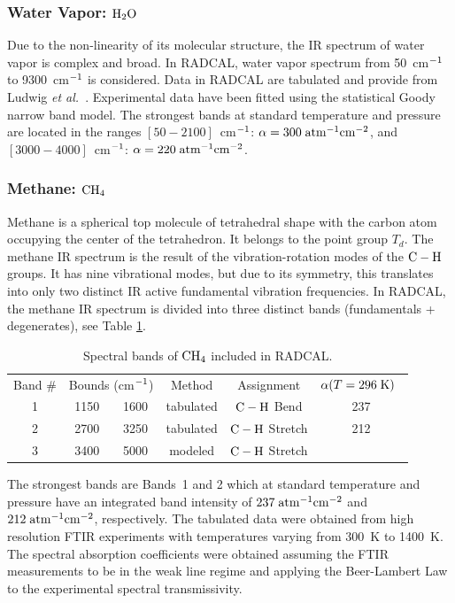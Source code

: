 \subsubsection{Water Vapor: $\rm H_2O$}

Due to the non-linearity of its molecular structure, the IR spectrum of water vapor is complex and broad. In RADCAL, water vapor spectrum from 50~cm$\rm ^{-1}$ to 9300~cm$\rm ^{-1}$ is considered. Data in RADCAL are tabulated and provide from Ludwig \textit{et al.}~\cite{Ludwig:NASA}. Experimental data have been fitted using the statistical Goody narrow band model. The strongest bands at standard temperature and pressure are located in the ranges $\left[50-2100\right]$~cm$\rm ^{-1}$: $\alpha = 300\;\rm {atm^{-1}cm^{-2}}$, and $\left[3000-4000\right]$~cm$\rm ^{-1}$: $\alpha = 220\;\rm {atm^{-1}cm^{-2}}$.

\subsubsection{Methane: $\rm CH_4$}

Methane is a spherical top molecule of tetrahedral shape with the carbon atom occupying the center of the tetrahedron. It belongs to the point group $T_d$. The methane IR spectrum is the result of the vibration-rotation modes of the $\rm C-H$ groups. It has nine vibrational modes, but due to its symmetry, this translates into only two distinct IR active fundamental vibration frequencies. In RADCAL, the methane IR spectrum is divided into three distinct bands (fundamentals + degenerates), see Table \ref{Table::CH4}.
\begin{table}[ht]
      \centering
      \caption{Spectral bands of $\rm CH_4$ included in RADCAL.}
      \vspace{0.1in}
      \label{Table::CH4}
    \begin{tabular}{|c|c|c|c|c|c|}
    \hline
    Band \# & \multicolumn{2}{|l|}{Bounds (cm$\rm ^{-1}$) } & Method & Assignment & $\alpha(T=296 \; {\rm K})$\ \\
    \cline{1-6}
    1 & 1150 & 1600 & tabulated &  $\rm C-H$ Bend    & 237  \\
    2 & 2700 & 3250 & tabulated &  $\rm C-H$ Stretch & 212  \\
    3 & 3400 & 5000 & modeled   &  $\rm C-H$ Stretch &   \\
    \hline
   \end{tabular}
\end{table}
The strongest bands are Bands~1 and 2 which at standard temperature and pressure have an integrated band intensity of $237\;\rm {atm^{-1}cm^{-2}}$ and $212\;\rm {atm^{-1}cm^{-2}}$, respectively. The tabulated data were obtained from high resolution FTIR experiments with temperatures varying from 300~K to 1400~K. The spectral absorption coefficients were obtained assuming the FTIR measurements to be in the weak line regime and applying the Beer-Lambert Law to the experimental spectral transmissivity.

